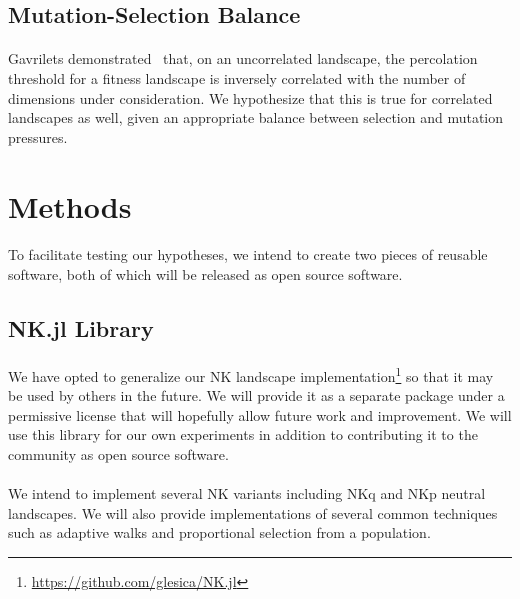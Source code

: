 \documentclass[12pt,letterpaper,titlepage,draft]{article}
\begin{document}
\subsection{Mutation-Selection Balance}

\paragraph{}
Gavrilets demonstrated~\cite{Gavrilets1997} that, on an uncorrelated landscape,
the percolation threshold for a fitness landscape is inversely correlated with
the number of dimensions under consideration. We hypothesize that this is true
for correlated landscapes as well, given an appropriate balance between
selection and mutation pressures.

\section{Methods}

\paragraph{}
To facilitate testing our hypotheses, we intend to create two pieces of
reusable software, both of which will be released as open source software.

\subsection{NK.jl Library}

\paragraph{}
We have opted to generalize our NK landscape
implementation\footnote{\url{https://github.com/glesica/NK.jl}} so that it may
be used by others in the future. We will provide it as a separate package under
a permissive license that will hopefully allow future work and improvement.  We
will use this library for our own experiments in addition to contributing it to
the community as open source software.

\paragraph{}
We intend to implement several NK variants including NKq and NKp neutral
landscapes. We will also provide implementations of several common techniques
such as adaptive walks and proportional selection from a population.
\end{document}
